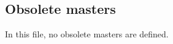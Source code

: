 \subsection{Obsolete masters}\label{sec:obsoletemasters}
\ifobsoletemaster
  \def\ProvidesFile #1[#2]{}
  \let\kulemt@div@master\@gobble
  \renewcommand*\kulemt@def@master[2]{}
  \renewcommand*\kulemt@obsolete@master[3][]{%
    \printmasterinfo{#2\if &#1&\else .#1\fi}{#3}}
  
\else
  In this file, no obsolete masters are defined.\par
\fi
\endgroup


